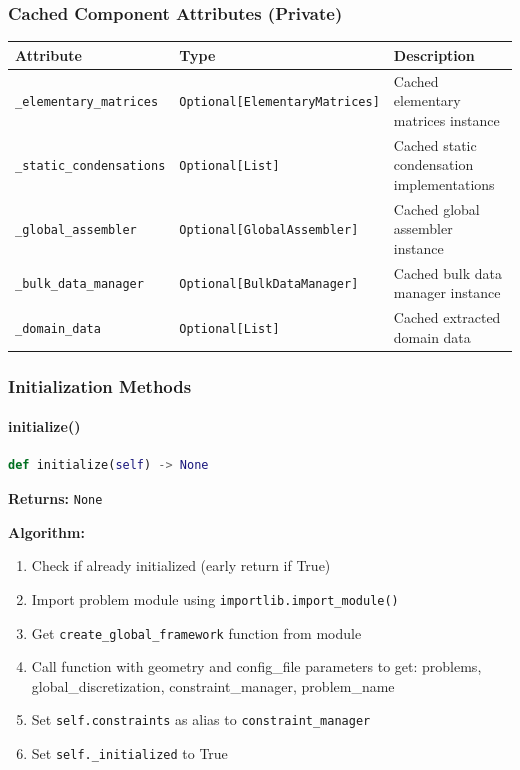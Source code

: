 \subsubsection{Cached Component Attributes (Private)}

\begin{longtable}{|p{5cm}|p{5.5cm}|p{4cm}|}
\hline
\textbf{Attribute} & \textbf{Type} & \textbf{Description} \\
\hline
\endhead

\texttt{\_elementary\_matrices} & \texttt{Optional[ElementaryMatrices]} & Cached elementary matrices instance \\
\hline

\texttt{\_static\_condensations} & \texttt{Optional[List]} & Cached static condensation implementations \\
\hline

\texttt{\_global\_assembler} & \texttt{Optional[GlobalAssembler]} & Cached global assembler instance \\
\hline

\texttt{\_bulk\_data\_manager} & \texttt{Optional[BulkDataManager]} & Cached bulk data manager instance \\
\hline

\texttt{\_domain\_data} & \texttt{Optional[List]} & Cached extracted domain data \\
\hline

\end{longtable}

\subsubsection{Initialization Methods}

\paragraph{initialize()}\leavevmode
\begin{lstlisting}[language=Python, caption=Initialize Method]
def initialize(self) -> None
\end{lstlisting}

\textbf{Returns:} \texttt{None}

\textbf{Algorithm:}
\begin{enumerate}
    \item Check if already initialized (early return if True)
    \item Import problem module using \texttt{importlib.import\_module()}
    \item Get \texttt{create\_global\_framework} function from module
    \item Call function with geometry and config\_file parameters to get: problems, global\_discretization, constraint\_manager, problem\_name
    \item Set \texttt{self.constraints} as alias to \texttt{constraint\_manager}
    \item Set \texttt{self.\_initialized} to True
\end{enumerate}

